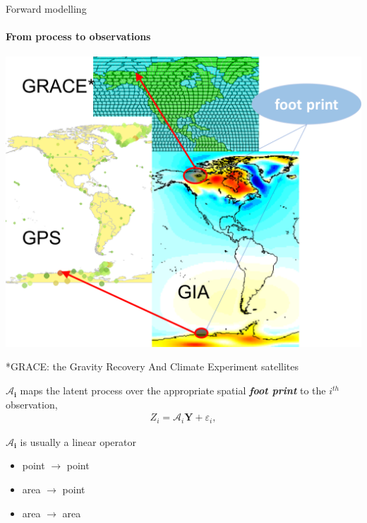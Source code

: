 \documentclass{beamer}
\begin{document}
\begin{frame}{Forward modelling}
\framesubtitle{From process to observations}

\begin{minipage}[c]{0.48\textwidth}
\begin{center}
\includegraphics[width = \textwidth]{images/footprint}
\end{center}
\tiny{*GRACE: the Gravity Recovery And Climate Experiment satellites}

\end{minipage}%
\hfill
\begin{minipage}[c]{0.5\textwidth}
$\bm{\mathcal{A}_i}$ maps the latent process over the appropriate spatial \emph{\textbf{foot print}} to the $i^{th}$ observation,
\begin{align}\label{eq:GPSi}
Z_i = \bm{\mathcal{A}}_i\bm{Y} + \varepsilon_i, 
\end{align} 

 $\bm{\mathcal{A}_i}$ is usually a linear operator 
 \begin{itemize}
 \item point $\to$ point
 \item area $\to$ point
 \item area $\to$ area
 \end{itemize}
\end{minipage}

\end{frame}
\end{document}

